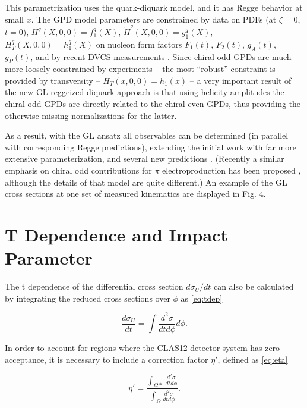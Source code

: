     This parametrization uses the quark-diquark model, and it has Regge behavior at small $x$. The GPD model parameters are constrained by data on PDFs (at $\zeta = 0$, $t = 0$), $H^q (X, 0, 0) = f^q_1 (X)$, $\tilde{H}^q (X, 0, 0) = g^q_1 (X)$, $H^q_T (X, 0, 0) = h^q_1 (X)$ on nucleon form factors $F_1(t)$, $F_2(t)$, $g_A(t)$, $g_P (t)$, and by recent DVCS measurements \parencite{2} \parencite{3}. Since chiral odd GPDs are much more loosely constrained by experiments – the most “robust” constraint is provided by transversity – $H_T (x, 0, 0) = h_1(x)$ – a very important result of the new GL reggeized diquark approach \parencite{10} is that using helicity amplitudes the chiral odd GPDs are directly related to the chiral even GPDs, thus providing the otherwise missing normalizations for the latter.
    
    As a result, with the GL ansatz all observables can be determined (in parallel with corresponding Regge predictions), extending the initial work \parencite{9} with far more extensive parameterization, and several new predictions \parencite{11, 10}. (Recently a similar emphasis on chiral odd contributions for $\pi$ electroproduction has been proposed \parencite{5}, although the details of that model are quite different.) An example of the GL cross sections at one set of measured kinematics are displayed in Fig. 4.
    \fi



\clearpage
\section{T Dependence and Impact Parameter}
    
    The t dependence of the differential cross section $d\sigma_U/dt$ can also be calculated by integrating the reduced cross sections over $\phi$ as \eqref{eq:tdep}
    
     \begin{equation}\label{eq:tdep}
        \frac{d\sigma_U}{dt} = \int \frac{d^2\sigma}{dtd\phi} d\phi.
    \end{equation}
    
    In order to account for regions where the CLAS12 detector system has zero acceptance, it is necessary to include a correction factor $\eta'$, defined as \eqref{eq:eta}
    
     \begin{equation}\label{eq:eta}
        \eta' = \frac{\int_{\Omega*} \frac{d^2\sigma}{dtd\phi} }{\int_{\Omega} \frac{d^2\sigma}{dtd\phi}}.
    \end{equation}

